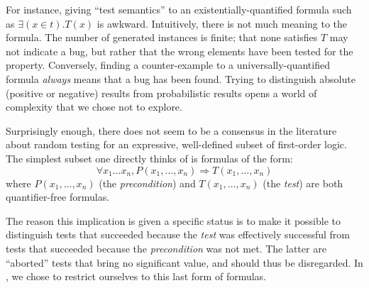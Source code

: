 For instance, giving ``test semantics'' to an existentially-quantified formula
such as $\exists(x \in t). T(x)$ is awkward. Intuitively, there is not much
meaning to the formula. The number of generated instances is finite; that none
satisfies $T$ may not indicate a bug, but rather that the wrong elements have
been tested for the property. Conversely, finding a counter-example to a
universally-quantified formula \emph{always} means that a bug has been found.
%
Trying to distinguish absolute (positive or negative) results from probabilistic
results opens a world of complexity that we chose not to explore.

Surprisingly enough, there does not seem to be a consensus in the
literature about random testing for an expressive, well-defined subset of
first-order logic. The simplest subset one directly thinks of is
formulas of the form:
\[ \forall x_1 \dots x_n, P(x_1, \dots, x_n) \Rightarrow T(x_1, \dots,
x_n) \] where $P(x_1, \dots, x_n)$ (the \emph{precondition}) and
$T(x_1, \dots, x_n)$ (the \emph{test}) are both quantifier-free
formulas.

The reason this implication is given a specific status is to make it possible to
distinguish tests that succeeded because the \emph{test} was effectively
successful from tests that succeeded because the \emph{precondition} was not
met. The latter are ``aborted'' tests that bring no significant value, and
should thus be disregarded. In \arti, we chose to restrict ourselves to this
last form of formulas.

